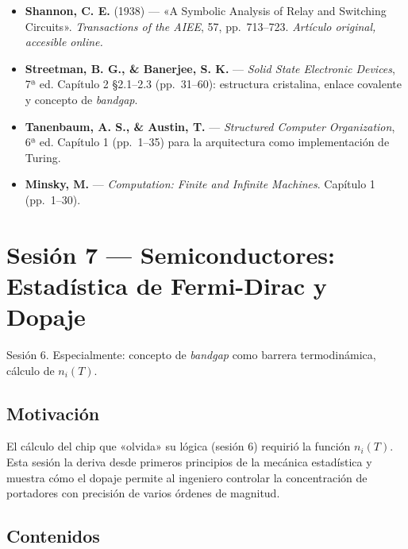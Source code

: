 \documentclass[11pt, letterpaper]{article}
\begin{document}
\begin{lecturas}
\begin{itemize}
  \item[$(\star)$] \textbf{Shannon, C. E.} (1938) — «A Symbolic Analysis of Relay and Switching Circuits». \textit{Transactions of the AIEE}, 57, pp.\ 713--723. \textit{Artículo original, accesible online.}
  \item[$(\star)$] \textbf{Streetman, B. G., \& Banerjee, S. K.} — \emph{Solid State Electronic Devices}, 7ª ed. Capítulo 2 §2.1--2.3 (pp.\ 31--60): estructura cristalina, enlace covalente y concepto de \emph{bandgap}.
  \item \textbf{Tanenbaum, A. S., \& Austin, T.} — \emph{Structured Computer Organization}, 6ª ed. Capítulo 1 (pp.\ 1--35) para la arquitectura como implementación de Turing.
  \item \textbf{Minsky, M.} — \emph{Computation: Finite and Infinite Machines}. Capítulo 1 (pp.\ 1--30).
\end{itemize}
\end{lecturas}

\newpage

\section{Sesión 7 — Semiconductores: Estadística de Fermi-Dirac y Dopaje}

\begin{prereqs}
Sesión 6. Especialmente: concepto de \emph{bandgap} como barrera termodinámica, cálculo de $n_i(T)$.
\end{prereqs}

\subsection*{Motivación}
El cálculo del chip que «olvida» su lógica (sesión 6) requirió la función $n_i(T)$. Esta sesión la deriva desde primeros principios de la mecánica estadística y muestra cómo el dopaje permite al ingeniero controlar la concentración de portadores con precisión de varios órdenes de magnitud.

\subsection{Contenidos}
\end{document}
